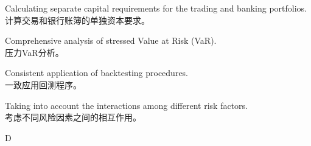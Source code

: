\documentclass{article}
\begin{document}
\begin{choices}
    \item Calculating separate capital requirements for the trading and banking portfolios.\\
    计算交易和银行账簿的单独资本要求。
    \item Comprehensive analysis of stressed Value at Risk (VaR).\\
    压力VaR分析。
    \item Consistent application of backtesting procedures.\\
    一致应用回测程序。
    \item Taking into account the interactions among different risk factors.\\
    考虑不同风险因素之间的相互作用。
\end{choices}

\begin{correctanswer}
    D
\end{correctanswer}
\end{document}
